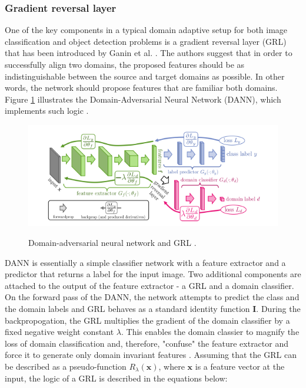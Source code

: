 \subsubsection{Gradient reversal layer}

One of the key components in a typical domain adaptive setup for both image classification and object detection problems is a gradient reversal layer (GRL) that has been introduced by Ganin et al. \cite{Ganin2015}. The authors suggest that in order to successfully align two domains, the proposed features should be as indistinguishable between the source and target domains as possible. In other words, the network should propose features that are familiar both domains. Figure \ref{DANN} illustrates the Domain-Adversarial Neural Network (DANN), which implements such logic \cite{Ganin2015}. 

\begin{figure}[htb]
	\begin{center}
		\includegraphics[width=16cm]{./GRL.png}
	\end{center}
	\caption{Domain-adversarial neural network and GRL \cite{Ganin2015}.}
	\begin{center}
		\label{DANN}
	\end{center}
\end{figure}

DANN is essentially a simple classifier network with a feature extractor and a predictor that returns a label for the input image. Two additional components are attached to the output of the feature extractor - a GRL and a domain classifier. On the forward pass of the DANN, the network attempts to predict the class and the domain labels and GRL behaves as a standard identity function $\mathbf{I}$. During the backpropogation, the GRL multiplies the gradient of the domain classifier by a fixed negative weight constant $\lambda$. This enables the domain classier to magnify the loss of domain classification and, therefore, "confuse" the feature extractor and force it to generate only domain invariant features \cite{Ganin2015}. Assuming that the GRL can be described as a pseudo-function $R_{\lambda}(\mathbf{x})$, where $\mathbf{x}$ is a feature vector at the input, the  logic of a GRL is described in the equations below:  

